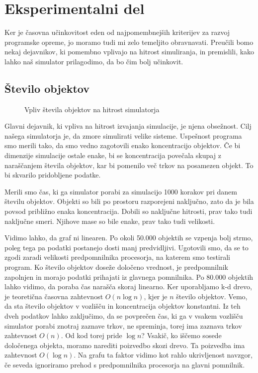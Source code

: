 \documentclass[a4paper,12pt]{article}
\begin{document}
\section{Eksperimentalni del}

Ker je časovna učinkovitost eden od najpomembnejših kriterijev za razvoj programske opreme,
jo moramo tudi mi zelo temeljito obravnavati. Preučili bomo nekaj dejavnikov, ki pomembno
vplivajo na hitrost simuliranja, in premislili, kako lahko naš simulator prilagodimo,
da bo čim bolj učinkovit. 

\subsection{Število objektov}

\begin{figure}
    \caption{Vpliv števila objektov na hitrost simulatorja}
\end{figure}

Glavni dejavnik, ki vpliva na hitrost izvajanja simulacije, je njena obsežnost. Cilj našega simulatorja je,
da zmore simulirati velike sisteme. Uspešnost programa smo merili tako, da smo vedno zagotovili enako
koncentracijo objektov. Če bi dimenzije simulacije ostale enake, bi se koncentracija povečala skupaj
z naraščanjem števila objektov, kar bi pomenilo več trkov na posamezen objekt. To bi skvarilo pridobljene podatke. 

Merili smo čas, ki ga simulator porabi za simulacijo 1000 korakov pri danem številu objektov.
Objekti so bili po prostoru razporejeni naključno, zato da je bila povsod približno enaka koncentracija. Dobili so
naključne hitrosti, prav tako tudi naključne smeri. Njihove mase so bile enake, prav tako tudi velikosti. 

Vidimo lahko, da graf ni linearen. Po okoli 50.000 objektih se vzpenja bolj strmo, poleg tega pa podatki
postanejo dosti manj predvidljivi. Ugotovili smo, da se to zgodi zaradi velikosti predpomnilnika procesorja, na
katerem smo testirali program. Ko število objektov doseže določeno vrednost, je predpomnilnik zapolnjen in
morajo podatki prihajati iz glavnega pomnilnika. Po 80.000 objektih lahko vidimo, da poraba čas narašča skoraj linearno.
Ker uporabljamo k-d drevo, je teoretična časovna zahtevnost $O(n \log n)$, kjer je $n$ število objektov.
Vemo, da sta število objektov v vozlišču in koncentracija objektov konstantni. Iz teh dveh podatkov
lahko zaključimo, da se povprečen čas, ki ga v vsakem vozlišču simulator porabi znotraj zaznave trkov, ne spreminja,
torej ima zaznava trkov zahtevnost $O(n)$. Od kod torej pride $\log n$?
Vsakič, ko iščemo sosede določenega objekta, moramo narediti poizvedbo skozi drevo. Ta poizvedba ima zahtevnost $O(\log n)$. 
Na grafu ta faktor vidimo kot rahlo ukrivljenost navzgor, če seveda ignoriramo prehod s predpomnilnika procesorja na glavni pomnilnik.
\end{document}
